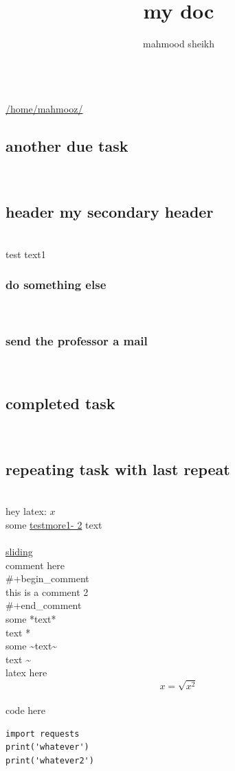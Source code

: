 \documentclass[11pt]{article}
\author{mahmood sheikh}
\title{my doc}
\begin{document}
\\
\href{/home/mahmooz/}{/home/mahmooz/}
\\
\subsection{another due task}
\\
\subsection{header my secondary header}
\\
test text1
\\
\subsubsection{do something else}
\\
\subsubsection{send the professor a mail}
\\
\subsection{completed task}
\\
\subsection{repeating task with last repeat}
\\
hey latex: \(x\)
\\
some \href{here1}{testmore1- 2} text
\\
\href{sliding.gif}{}
\\
\href{sliding}{sliding}
\\
comment here
\\
\#+begin\_comment
\\
this is a comment 2
\\
\#+end\_comment
\\
some *text*
\\
text *
\\
some \textasciitilde{}text\textasciitilde{}
\\
text \textasciitilde{}
\\
latex here
\\
\[ x = \sqrt{x^2} \]
\\
code here
\\
\begin{lstlisting}import requests
print('whatever')
print('whatever2')
\end{lstlisting}
\end{document}
